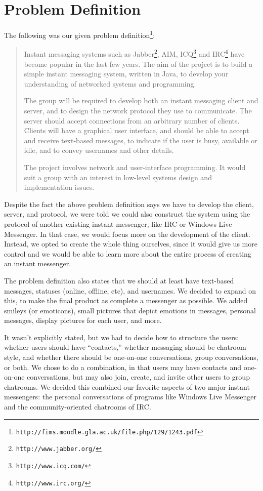 \section{Problem Definition}
The following was our given problem definition\footnote{\texttt{http://fims.moodle.gla.ac.uk/file.php/129/1243.pdf}}:

\begin{quote}
Instant messaging systems such as Jabber\footnote{\texttt{http://www.jabber.org/}}, AIM, ICQ\footnote{\texttt{http://www.icq.com/}} and IRC\footnote{\texttt{http://www.irc.org/}} have become popular in the last few years. The aim of the project is to build a simple instant messaging system, written in Java, to develop your understanding of networked systems and programming.

The group will be required to develop both an instant messaging client and server, and to design the network protocol they use to communicate. The server should accept connections from an arbitrary number of clients. Clients will have a graphical user interface, and should be able to accept and receive text-based messages, to indicate if the user is busy, available or idle, and to convey usernames and other details.

The project involves network and user-interface programming. It would suit a group with an interest in low-level systems design and implementation issues.
\end{quote}

Despite the fact the above problem definition says we have to develop the client, server, and protocol, we were told we could also construct the system using the protocol of another existing instant messenger, like IRC or Windows Live Messenger. In that case, we would focus more on the development of the client. Instead, we opted to create the whole thing ourselves, since it would give us more control and we would be able to learn more about the entire process of creating an instant messenger.

The problem definition also states that we should at least have text-based messages, statuses (online, offline, etc), and usernames. We decided to expand on this, to make the final product as complete a messenger as possible. We added smileys (or emoticons), small pictures that depict emotions in messages, personal messages, display pictures for each user, and more.

It wasn't explicitly stated, but we had to decide how to structure the users: whether users should have ``contacts,'' whether messaging should be chatroom-style, and whether there should be one-on-one conversations, group conversations, or both. We chose to do a combination, in that users may have contacts and one-on-one conversations, but may also join, create, and invite other users to group chatrooms. We decided this combined our favorite aspects of two major instant messengers: the personal conversations of programs like Windows Live Messenger and the community-oriented chatrooms of IRC.

